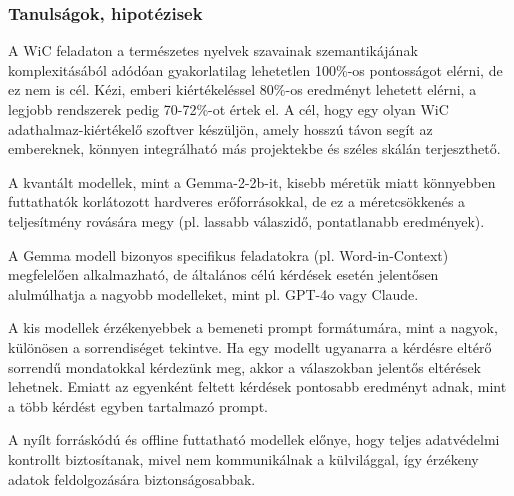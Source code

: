 \documentclass[12pt]{report}
\theoremstyle{definition}
\begin{document}
\subsubsection{Tanulságok, hipotézisek}
A WiC feladaton a természetes nyelvek szavainak szemantikájának komplexitásából adódóan gyakorlatilag lehetetlen 100\%-os pontosságot elérni, de ez nem is cél. Kézi, emberi kiértékeléssel 80\%-os eredményt lehetett elérni, a legjobb rendszerek pedig 70-72\%-ot értek el. A cél, hogy egy olyan WiC adathalmaz-kiértékelő szoftver készüljön, amely hosszú távon segít az embereknek, könnyen integrálható más projektekbe és széles skálán terjeszthető.

A kvantált modellek, mint a Gemma-2-2b-it, kisebb méretük miatt könnyebben futtathatók korlátozott hardveres erőforrásokkal, de ez a méretcsökkenés a teljesítmény rovására megy (pl. lassabb válaszidő, pontatlanabb eredmények).

A Gemma modell bizonyos specifikus feladatokra (pl. Word-in-Context) megfelelően alkalmazható, de általános célú kérdések esetén jelentősen alulmúlhatja a nagyobb modelleket, mint pl. GPT-4o vagy Claude.

A kis modellek érzékenyebbek a bemeneti prompt formátumára, mint a nagyok, különösen a sorrendiséget tekintve. Ha egy modellt ugyanarra a kérdésre eltérő sorrendű mondatokkal kérdezünk meg, akkor a válaszokban jelentős eltérések lehetnek. Emiatt az egyenként feltett kérdések pontosabb eredményt adnak, mint a több kérdést egyben tartalmazó prompt.

A nyílt forráskódú és offline futtatható modellek előnye, hogy teljes adatvédelmi kontrollt biztosítanak, mivel nem kommunikálnak a külvilággal, így érzékeny adatok feldolgozására biztonságosabbak.






\end{document}
